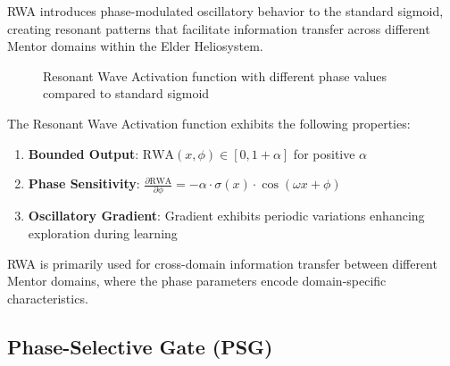 RWA introduces phase-modulated oscillatory behavior to the standard sigmoid, creating resonant patterns that facilitate information transfer across different Mentor domains within the Elder Heliosystem.

\begin{figure}[h]
\centering
{}
\caption{Resonant Wave Activation function with different phase values compared to standard sigmoid}
\end{figure}

\begin{proposition}
The Resonant Wave Activation function exhibits the following properties:
\begin{enumerate}
    \item \textbf{Bounded Output}: $\text{RWA}(x, \phi) \in [0, 1+\alpha]$ for positive $\alpha$
    \item \textbf{Phase Sensitivity}: $\frac{\partial\text{RWA}}{\partial\phi} = -\alpha \cdot \sigma(x) \cdot \cos(\omega x + \phi)$
    \item \textbf{Oscillatory Gradient}: Gradient exhibits periodic variations enhancing exploration during learning
\end{enumerate}
\end{proposition}

RWA is primarily used for cross-domain information transfer between different Mentor domains, where the phase parameters encode domain-specific characteristics.

\subsection{Phase-Selective Gate (PSG)}


